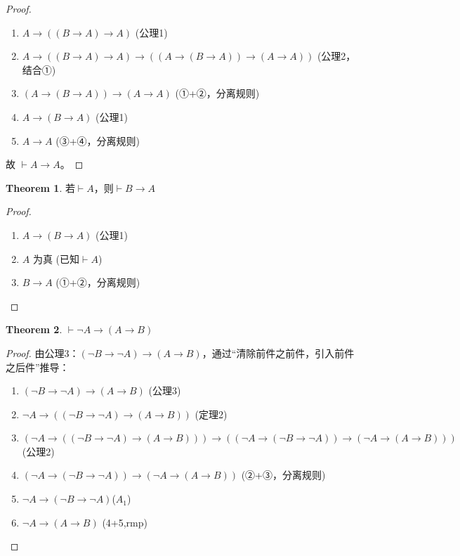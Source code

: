 \documentclass[oneside]{book}
\theoremstyle{definition}
\newtheorem{theorem}{Theorem}[section]
\begin{document}
\begin{proof}
	\begin{enumerate}
		\item $A \to ((B \to A) \to A)$ \hfill (公理1)
		\item $A \to ((B \to A) \to A) \to ((A \to (B \to A)) \to (A \to A))$ \hfill (公理2，结合①)
		\item $(A \to (B \to A)) \to (A \to A)$ \hfill (①+②，分离规则)
		\item $A \to (B \to A)$ \hfill (公理1)
		\item $A \to A$ \hfill (③+④，分离规则)
	\end{enumerate}
	故 $\vdash A \to A$。
\end{proof}



\begin{theorem}
	若$\vdash A$，则$\vdash B \to A$
\end{theorem}
\begin{proof}
	\begin{enumerate}
		\item $A \to (B \to A)$ \hfill (公理1)
		\item $A$ 为真 \hfill (已知$\vdash A$)
		\item $B \to A$ \hfill (①+②，分离规则)
	\end{enumerate}
\end{proof}



\begin{theorem}
	$\vdash \neg A \to (A \to B)$
\end{theorem}
\begin{proof}
由公理3：$(\neg B \to \neg A) \to (A \to B)$，通过“清除前件之前件，引入前件之后件”推导：
\begin{enumerate}
	\item $(\neg B \to \neg A) \to (A \to B)$ \hfill (公理3)
	\item $\neg A \to ((\neg B \to \neg A) \to (A \to B))$ \hfill (定理2)
	\item $\left(\neg A \to ((\neg B \to \neg A) \to (A \to B))\right) \to \left((\neg A \to (\neg B \to \neg A)) \to (\neg A \to (A \to B))\right)$ \hfill (公理2)
	\item $(\neg A \to (\neg B \to \neg A)) \to (\neg A \to (A \to B))$ \hfill (②+③，分离规则)
	\item \(\neg A\to(\neg B\to \neg A)\)\hfill(\(A_1\))
	\item $\neg A \to (A \to B)$ \hfill (4+5,rmp)
\end{enumerate}
\end{proof}
\end{document}

